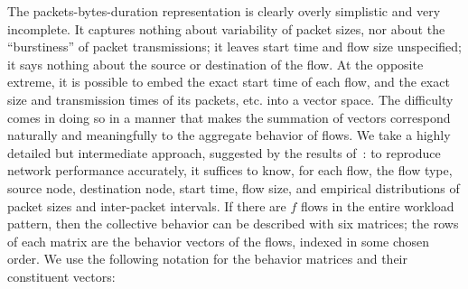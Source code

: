 \documentclass[twocolumn,final]{svjour3}
\begin{document}

The {packets-bytes-duration} representation is clearly overly simplistic and very incomplete. It captures nothing about variability of packet sizes, nor about the ``burstiness'' of packet transmissions; it leaves start time and flow size unspecified; it says nothing about the source or destination of the flow. At the opposite extreme, it is possible to embed the exact start time of each flow, and the exact size and transmission times of its packets, etc. into a vector space. The difficulty comes in doing so in a manner that makes the summation of vectors correspond naturally and meaningfully to the aggregate behavior of flows. We take a highly detailed but intermediate approach, suggested by the results of~\cite{Karpinski07:realism}: to reproduce network performance accurately, it suffices to know, for each flow, the flow type, source node, destination node, start time, flow size, and empirical distributions of packet sizes and inter-packet intervals. If there are $f$ flows in the entire workload pattern, then the collective behavior can be described with six matrices; the rows of each matrix are the behavior vectors of the flows, indexed in some chosen order. We use the following notation for the behavior matrices and their constituent vectors:\vspace{-0.25em}
\end{document}
